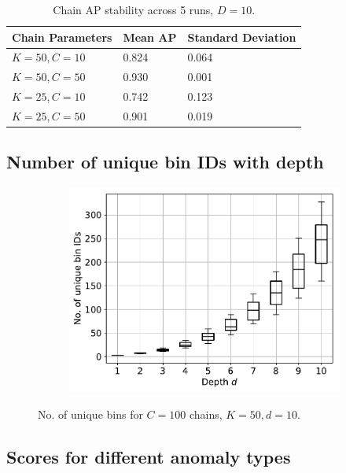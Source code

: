 \documentclass[11pt,onecolumn]{article}
\begin{document}
\begin{table}[ht!]
    \centering
		\begin{tabular}{lll}
				\toprule
				\textbf{Chain Parameters} & \textbf{Mean AP} & \textbf{Standard Deviation}\\
				\midrule
				$K=50, C=10$ & 0.824 & 0.064\\
				$K=50, C=50$ & 0.930 & 0.001\\
				$K=25, C=10$ & 0.742 & 0.123\\
				$K=25, C=50$ & 0.901 & 0.019\\
				\bottomrule
		\end{tabular}
		\caption{Chain AP stability across 5 runs, $D=10$.}
\end{table}

\subsection{Number of unique bin IDs with depth}

\begin{figure}[h!]
	\centering
	\begin{subfigure}[b]{0.3\textwidth}
			\centering
			\includegraphics[width=\linewidth]{fig/chains_binids_k50c100d10.pdf}
	\end{subfigure}
	\caption{No. of unique bins for $C=100$ chains, $K=50, d=10$.}
\end{figure}

\subsection{Scores for different anomaly types}
\end{document}
